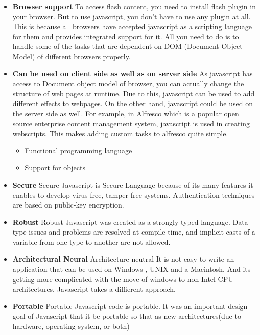 \begin{itemize}
	\item \textbf{Browser support}
To access flash content, you need to install flash plugin in your browser. But to use javascript, you don't have to use any plugin at all. This is because all browsers have accepted javascript as a scripting language for them and provides integrated support for it. All you need to do is to handle some of the tasks that are dependent on DOM (Document Object Model) of different browsers properly.


\item \textbf{Can be used on client side as well as on server side}
As javascript has access to Document object model of browser, you can actually change the structure of web pages at runtime. Due to this, javascript can be used to add different effects to webpages. On the other hand, javascript could be used on the server side as well. For example, in Alfresco which is a popular open source enterprise content management system, javascript is used in creating webscripts. This makes adding custom tasks to alfresco quite simple.

\begin{itemize}
	\item Functional programming language
\item Support for objects

\end{itemize}

\item \textbf{Secure}
Secure Javascript is Secure Language because of its many features it enables to
develop virus-free, tamper-free systems. Authentication techniques are
based on public-key encryption.

\item \textbf{Robust}
Robust Javascript was created as a strongly typed language. Data type issues
and problems are resolved at compile-time, and implicit casts of a variable
from one type to another are not allowed.

\item \textbf{Architectural Neural}
Architecture neutral It is not easy to write an application that can be used
on Windows , UNIX and a Macintosh. And its getting more complicated
with the move of windows to non Intel CPU architectures.
Javascript takes a diffierent approach. 
\item \textbf{Portable}
Portable Javascript code is portable. It was an important design goal of Javascript that it
be portable so that as new architectures(due to hardware, operating system,
or both)


\end{itemize}

